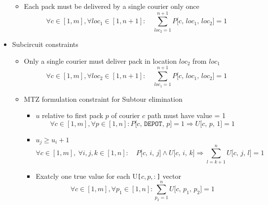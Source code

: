 \begin{itemize}
\begin{itemize}
        \item Each pack must be delivered by a single courier only once
        \begin{equation}
            \label{eq:gen_path_constr3}
            \forall c \in [1, m],
            \forall loc_1 \in [1, n+1]:
            \quad
            \sum_{loc_2=1}^{n+1} P\texttt{[$c$, $loc_1$, $loc_2$]} = 1
        \end{equation}
    \end{itemize}
    \item Subcircuit constraints
    \begin{itemize}
        \item Only a single courier must deliver pack in location $loc_2$ from $loc_1$
        \begin{equation}
            \label{eq:subtour_constr1}
            \forall c \in [1, m],
            \forall loc_2 \in [1, n+1]:
            \quad
            \sum_{loc_1=1}^{n+1} P\texttt{[$c$, $loc_1$, $loc_2$]} = 1
        \end{equation}
        \item MTZ formulation constraint for Subtour elimination
        \begin{itemize}
            \item $u$ relative to first pack $p$ of courier $c$ path must have value = 1
            \begin{equation}
                \label{eq:subtour_constr2}
                \forall c \in [1, m],
                \forall p \in [1, n]:
                P\texttt{[$c$, DEPOT, $p$]}=1
                \Rightarrow
                U\texttt{[$c$, $p$, $1$]}=1
            \end{equation}
            \item $u_j \geq u_i + 1$
            \begin{equation}
                \label{eq:subtour_constr3}
                \forall c \in [1, m], \ \forall i, j, k \in [1, n]: \quad
                P\texttt{[$c$, $i$, $j$]} \land U\texttt{[$c$, $i$, $k$]} \Rightarrow
                \sum_{l=k+1}^{n} U\texttt{[$c$, $j$, $l$]} = 1
            \end{equation}
            
            \item Exatcly one true value for each U\texttt{[$c, p, :$]} vector
            \begin{equation}
                \label{eq:subtour_constr4}
                \forall c \in [1, m],
                \forall p_1 \in [1, n]:
                \sum_{p_2=1}^{n} U\texttt{[$c$, $p_1$, $p_2$]} = 1
            \end{equation}


\end{itemize}
\end{itemize}
\end{itemize}
